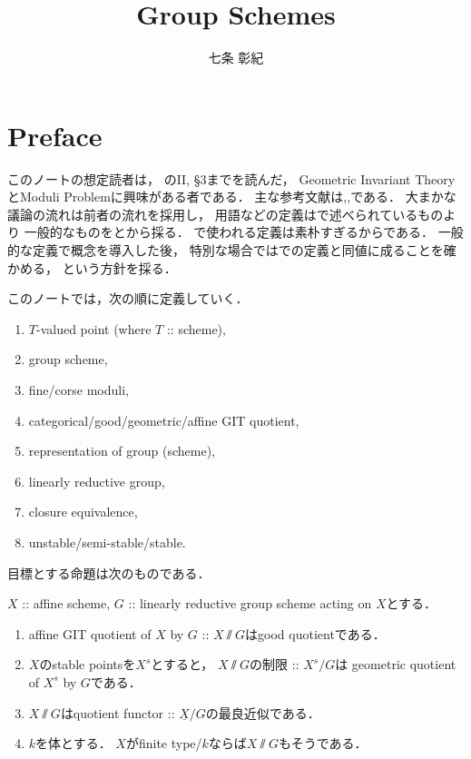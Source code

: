 \documentclass[a4paper]{jsarticle}
\newcommand{\func}[1]{\underline{#1}}
\begin{document}
\title{Group Schemes}
\author{七条 彰紀}
\maketitle
\tableofcontents

\section{Preface}
    このノートの想定読者は，
    \cite{HarAG}のII, \S 3までを読んだ，
    Geometric Invariant TheoryとModuli Problemに興味がある者である．
    主な参考文献は\cite{Muk1},\cite{AV},\cite{Hos}である．
    大まかな議論の流れは前者の流れを採用し，
    用語などの定義は\cite{Muk1}で述べられているものより
    一般的なものを\cite{AV}と\cite{Hos}から採る．
    \cite{Muk1}で使われる定義は素朴すぎるからである．
    一般的な定義で概念を導入した後，
    特別な場合では\cite{Muk1}での定義と同値に成ることを確かめる，
    という方針を採る．

    このノートでは，次の順に定義していく．
    \begin{enumerate}
        \item $T$-valued point (where $T$ :: scheme),
        \item group scheme,
        \item fine/corse moduli,
        \item categorical/good/geometric/affine GIT quotient,
        \item representation of group (scheme),
        \item linearly reductive group,
        \item closure equivalence,
        \item unstable/semi-stable/stable.
    \end{enumerate}

    目標とする命題は次のものである．
    \begin{Thm}
        $X$ :: affine scheme,
        $G$ :: linearly reductive group scheme acting on $X$とする．
        \begin{enumerate}[label=(\roman*), leftmargin=*]
        \item 
        affine GIT quotient of $X$ by $G$ :: $X \sslash G$はgood quotientである．

        \item
        $X$のstable pointsを$X^s$とすると，
        $X \sslash G$の制限 :: $X^s \slash G$は
        geometric quotient of $X^s$ by $G$である．

        \item
        $X \sslash G$はquotient functor :: $\func{X} \slash G$の最良近似である．

        \item
        $k$を体とする．
        $X$がfinite type/$k$ならば$X \sslash G$もそうである．
        \end{enumerate}
    \end{Thm}
\end{document}
